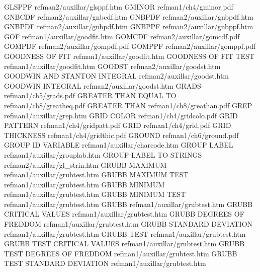 GLSPPF                                  refman2/auxillar/glsppf.htm
GMINOR                                  refman1/ch4/gminor.pdf
GNBCDF                                  refman2/auxillar/gnbcdf.htm
GNBPDF                                  refman2/auxillar/gnbpdf.htm
GNBPDF                                  refman2/auxillar/gnbpdf.htm
GNBPPF                                  refman2/auxillar/gnbppf.htm
GOF                                     refman1/auxillar/goodfit.htm
GOMCDF                                  refman2/auxillar/gomcdf.pdf
GOMPDF                                  refman2/auxillar/gompdf.pdf
GOMPPF                                  refman2/auxillar/gomppf.pdf
GOODNESS OF FIT                         refman1/auxillar/goodfit.htm
GOODNESS OF FIT TEST                    refman1/auxillar/goodfit.htm
GOODST                                  refman2/auxillar/goodst.htm
GOODWIN AND STANTON INTEGRAL            refman2/auxillar/goodst.htm
GOODWIN INTEGRAL                        refman2/auxillar/goodst.htm
GRADS                                   refman1/ch5/grads.pdf
GREATER THAN EQUAL TO                   refman1/ch8/greatheq.pdf
GREATER THAN                            refman1/ch8/greathan.pdf
GREP                                    refman1/auxillar/grep.htm
GRID COLOR                              refman1/ch4/gridcolo.pdf
GRID PATTERN                            refman1/ch4/gridpatt.pdf
GRID                                    refman1/ch4/grid.pdf
GRID THICKNESS                          refman1/ch4/gridthic.pdf
GROUND                                  refman1/ch6/ground.pdf
GROUP ID VARIABLE                       refman1/auxillar/charcode.htm
GROUP LABEL                             refman1/auxillar/grouplab.htm
GROUP LABEL TO STRINGS                  refman2/auxillar/gl_strin.htm
GRUBB MAXIMUM                           refman1/auxillar/grubtest.htm
GRUBB MAXIMUM TEST                      refman1/auxillar/grubtest.htm
GRUBB MINIMUM                           refman1/auxillar/grubtest.htm
GRUBB MINIMUM TEST                      refman1/auxillar/grubtest.htm
GRUBB                                   refman1/auxillar/grubtest.htm
GRUBB CRITICAL VALUES                   refman1/auxillar/grubtest.htm
GRUBB DEGREES OF FREDDOM                refman1/auxillar/grubtest.htm
GRUBB STANDARD DEVIATION                refman1/auxillar/grubtest.htm
GRUBB TEST                              refman1/auxillar/grubtest.htm
GRUBB TEST CRITICAL VALUES              refman1/auxillar/grubtest.htm
GRUBB TEST DEGREES OF FREDDOM           refman1/auxillar/grubtest.htm
GRUBB TEST STANDARD DEVIATION           refman1/auxillar/grubtest.htm
